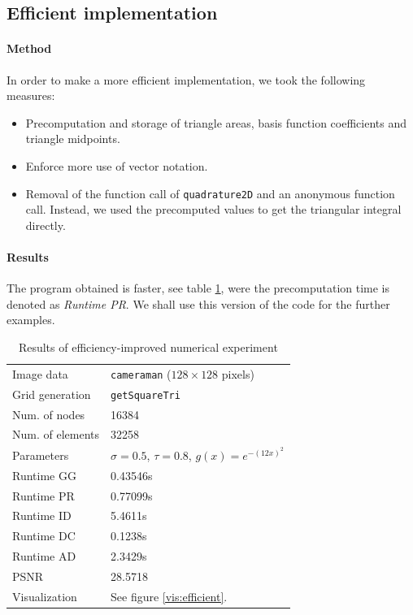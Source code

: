 \documentclass{report}
\begin{document}
\subsection{Efficient implementation}

\paragraph{Method}

In order to make a more efficient implementation, we took the following measures:

\begin{itemize}
    \item
    Precomputation and storage of triangle areas, basis function coefficients and triangle midpoints.
    \item 
    Enforce more use of vector notation.
    \item 
    Removal of the function call of \texttt{quadrature2D} and an anonymous function call. Instead, we used the precomputed values to get the triangular integral directly.
\end{itemize}

\paragraph{Results}

The program obtained is faster, see table \ref{res:efficient}, were the precomputation time is denoted as \textit{Runtime PR}. We shall use this version of the code for the further examples.

\begin{table}[h]
	\centering
	\begin{tabular}{|ll}
		Image data & \texttt{cameraman} ($128 \times 128$ pixels) \\
		Grid generation & \texttt{getSquareTri} \\
		Num. of nodes & 16384\\
		Num. of elements & 32258\\
		Parameters & $\sigma=0.5$, $\tau=0.8$, $g(x) = e^{-(12 x)^2}$ \\
		Runtime GG & 0.43546s \\
		Runtime PR & 0.77099s \\
		Runtime ID & 5.4611s \\
		Runtime DC & 0.1238s \\
		Runtime AD & 2.3429s \\
		PSNR & 28.5718 \\
		Visualization & See figure \ref{vis:efficient}.\\
	\end{tabular}
	\caption{Results of efficiency-improved numerical experiment}
	\label{res:efficient}
\end{table}
\end{document}
